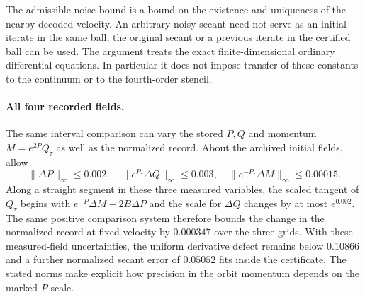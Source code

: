 The admissible-noise bound is a bound on the existence
and uniqueness of the nearby decoded velocity.
An arbitrary noisy secant need not serve as an initial
iterate in the same ball; the original secant or a
previous iterate in the certified ball can be used.
The argument treats the exact finite-dimensional
ordinary differential equations. In particular it
does not impose transfer of these constants to the
continuum or to the fourth-order stencil.


\paragraph{All four recorded fields.}
The same interval comparison can vary the stored
$P,Q$ and momentum $M=e^{2P}Q_\tau$ as well as the
normalized record. About the archived initial fields,
allow
\[
 \|\Delta P\|_\infty\le0.002,\quad
 \|e^{P_*}\Delta Q\|_\infty\le0.003,\quad
 \|e^{-P_*}\Delta M\|_\infty\le0.00015 .
\]
Along a straight segment in these three measured
variables, the scaled tangent of $Q_\tau$ begins with
$e^{-P}\Delta M-2B\Delta P$ and the scale for
$\Delta Q$ changes by at most $e^{0.002}$.
The same positive comparison system therefore
bounds the change in the normalized record at fixed
velocity by $0.000347$ over the three grids.
With these measured-field uncertainties, the uniform
derivative defect remains below $0.10866$ and
a further normalized secant error of $0.05052$
fits inside the certificate. The stated norms
make explicit how precision in the orbit momentum
depends on the marked $P$ scale.
